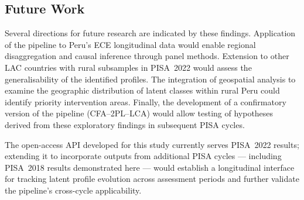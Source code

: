 \documentclass[twocolumn,12pt]{article}
\begin{document}
\subsection{Future Work}

Several directions for future research are indicated by these findings.
Application of the pipeline to Peru's ECE longitudinal data would enable
regional disaggregation and causal inference through panel methods. Extension
to other LAC countries with rural subsamples in PISA~2022 would assess the
generalisability of the identified profiles. The integration of geospatial
analysis to examine the geographic distribution of latent classes within
rural Peru could identify priority intervention areas. Finally, the
development of a confirmatory version of the pipeline (CFA--2PL--LCA) would
allow testing of hypotheses derived from these exploratory findings in
subsequent PISA cycles.

The open-access API developed for this study currently serves
PISA~2022 results; extending it to incorporate outputs from
additional PISA cycles --- including PISA~2018 results
demonstrated here --- would establish a longitudinal interface
for tracking latent profile evolution across assessment periods
and further validate the pipeline's cross-cycle applicability.


\printbibliography

\end{document}
